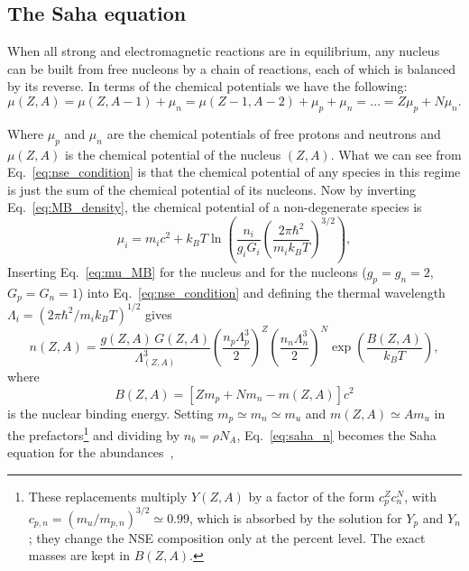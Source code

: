 \subsection{The Saha equation}\label{sec:saha}
 
When all strong and electromagnetic reactions are in equilibrium, any nucleus can be built from free nucleons by a chain of reactions, each of which is balanced by its reverse.
In terms of the chemical potentials we have the following:
\begin{equation}\label{eq:nse_condition}
  \mu(Z,A)=\mu(Z,A-1)+\mu_n=\mu(Z-1,A-2)+\mu_p+\mu_n=\dots=Z\mu_p+N\mu_n.
\end{equation} 

Where $\mu_p$ and $\mu_n$ are the chemical potentials of free protons and neutrons and $\mu(Z,A)$ is the chemical potential of the nucleus $(Z,A)$.
What we can see from Eq.~\ref{eq:nse_condition} is that the chemical potential of any species in this regime is just the sum of the chemical potential of its nucleons. 
Now by inverting Eq.~\ref{eq:MB_density}, the chemical potential of a non-degenerate species is
\begin{equation}\label{eq:mu_MB}
  \mu_i=m_ic^2+k_BT\ln\left(\frac{n_i}{g_iG_i}\left(\frac{2\pi \hbar^2}{m_i k_BT}\right)^{3/2}\right),
\end{equation}
Inserting Eq.~\ref{eq:mu_MB} for the nucleus and for the nucleons ($g_p=g_n=2$, $G_p=G_n=1$) into Eq.~\ref{eq:nse_condition} and defining the thermal wavelength $\Lambda_i=(2\pi \hbar^2/m_ik_BT)^{1/2}$ gives
\begin{equation}\label{eq:saha_n}
  n(Z,A)=\frac{g(Z,A)\,G(Z,A)}{\Lambda_{(Z,A)}^3}\left(\frac{n_p\Lambda_p^3}{2}\right)^{Z}\left(\frac{n_n\Lambda_n^3}{2}\right)^{N}\exp\left(\frac{B(Z,A)}{k_BT}\right),
\end{equation}
where
\begin{equation}\label{eq:binding}
  B(Z,A)=\left[Zm_p+Nm_n-m(Z,A)\right]c^2
\end{equation}
is the nuclear binding energy.
Setting $m_p\simeq m_n\simeq m_u$ and $m(Z,A)\simeq Am_u$ in the prefactors\footnote{These replacements multiply $Y(Z,A)$ by a factor of the form $c_p^{Z}c_n^{N}$, with $c_{p,n}=(m_u/m_{p,n})^{3/2}\simeq0.99$, which is absorbed by the solution for $Y_p$ and $Y_n$; they change the NSE composition only at the percent level. The exact masses are kept in $B(Z,A)$.} and dividing by $n_b=\rho N_A$, Eq.~\ref{eq:saha_n} becomes the Saha equation for the abundances~\cite{clayton_principles_1983,reichert_nuclear_2023},
